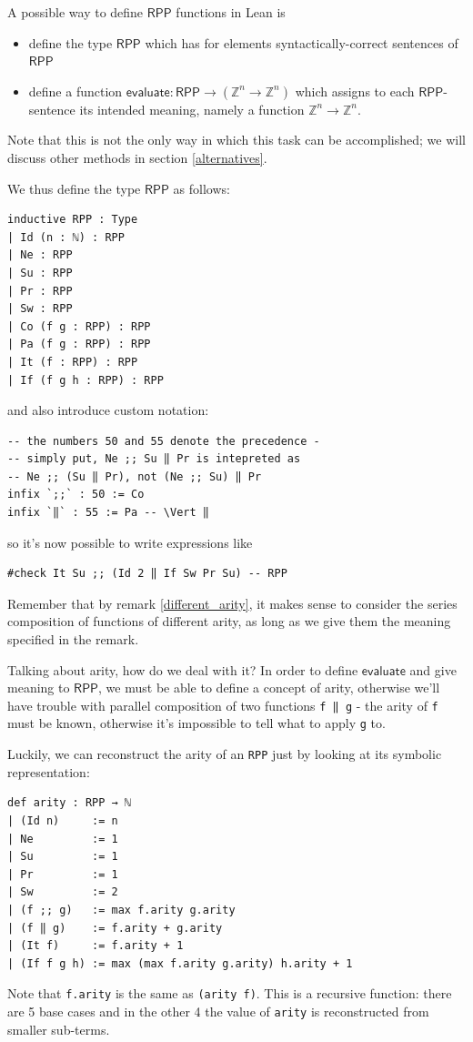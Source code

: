 \documentclass{book}
\theoremstyle{definition}
\theoremstyle{remark}
\theoremstyle{plain}
\newcommand{\ZZ}{\mathbb{Z}}
\newcommand{\RPP}{\mathsf{RPP}}
\begin{document}
A possible way to define $\RPP$ functions in Lean is
\begin{itemize}
\item define the type $\RPP$ which has for elements syntactically-correct sentences of $\RPP$
\item define a function $\mathsf{evaluate} : \RPP \to (\ZZ^n \to \ZZ^n)$ which assigns to each $\RPP$-sentence its intended meaning,
namely a function $\ZZ^n \to \ZZ^n$.
\end{itemize}
Note that this is not the only way in which this task can be accomplished;
we will discuss other methods in section \ref{alternatives}.

We thus define the type $\RPP$ as follows:
\begin{lstlisting}
inductive RPP : Type
| Id (n : ℕ) : RPP
| Ne : RPP
| Su : RPP
| Pr : RPP
| Sw : RPP
| Co (f g : RPP) : RPP
| Pa (f g : RPP) : RPP
| It (f : RPP) : RPP
| If (f g h : RPP) : RPP
\end{lstlisting}
and also introduce custom notation:
\begin{lstlisting}
-- the numbers 50 and 55 denote the precedence -
-- simply put, Ne ;; Su ‖ Pr is intepreted as
-- Ne ;; (Su ‖ Pr), not (Ne ;; Su) ‖ Pr
infix `;;` : 50 := Co
infix `‖` : 55 := Pa -- \Vert ‖
\end{lstlisting}
so it's now possible to write expressions like
\begin{lstlisting}
#check It Su ;; (Id 2 ‖ If Sw Pr Su) -- RPP
\end{lstlisting}
Remember that by remark \ref{different_arity}, it makes sense to consider the series composition of functions of different arity,
as long as we give them the meaning specified in the remark.

Talking about arity, how do we deal with it?
In order to define $\mathsf{evaluate}$ and give meaning to $\RPP$,
we must be able to define a concept of arity,
otherwise we'll have trouble with parallel composition of two functions \lstinline{f ‖ g} -
the arity of \lstinline{f} must be known,
otherwise it's impossible to tell what to apply \lstinline{g} to.

Luckily, we can reconstruct the arity of an \lstinline{RPP} just by looking at its symbolic representation:
\begin{lstlisting}
def arity : RPP → ℕ
| (Id n)     := n
| Ne         := 1
| Su         := 1
| Pr         := 1
| Sw         := 2
| (f ;; g)   := max f.arity g.arity
| (f ‖ g)    := f.arity + g.arity
| (It f)     := f.arity + 1
| (If f g h) := max (max f.arity g.arity) h.arity + 1
\end{lstlisting}
Note that \lstinline{f.arity} is the same as \lstinline{(arity f)}.
This is a recursive function:
there are 5 base cases and in the other 4 the value of \lstinline{arity} is reconstructed from smaller sub-terms.
\end{document}
